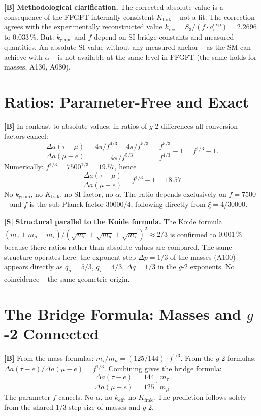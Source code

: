 \textbf{[B]} \textbf{Methodological clarification.} The corrected absolute value
is a consequence of the FFGFT-internally consistent $K_\text{frak}$ -- not a fit.
The correction agrees with the experimentally reconstructed value
$k_\text{rec}=S_3/(f\cdot a_e^\text{exp})=2{.}2696$ to $0{.}033\,\%$.
But: $k_\text{geom}$ and $f$ depend on SI bridge constants and measured quantities.
An absolute SI value without any measured anchor -- as the SM can achieve with
$\alpha$ -- is not available at the same level in FFGFT (the same holds for
masses, A130, A080).

\section{Ratios: Parameter-Free and Exact}

\textbf{[B]} In contrast to absolute values, in ratios of $g$-2 differences all
conversion factors cancel:
\[
  \frac{\Delta a(\tau-\mu)}{\Delta a(\mu-e)}
  = \frac{4\pi/f^{4/3}-4\pi/f^{5/3}}{4\pi/f^{5/3}}
  = \frac{f^{5/3}}{f^{4/3}} - 1
  = f^{1/3} - 1.
\]
Numerically: $f^{1/3}=7500^{1/3}=19{.}57$, hence
\[
  \boxed{\;\frac{\Delta a(\tau-\mu)}{\Delta a(\mu-e)} = f^{1/3}-1 = 18{.}57\;}
\]
No $k_\text{geom}$, no $K_\text{frak}$, no SI factor, no $\alpha$. The ratio
depends exclusively on $f=7500$ -- and $f$ is the sub-Planck factor $30000/4$,
following directly from $\xi=4/30000$.

\textbf{[S]} \textbf{Structural parallel to the Koide formula.} The Koide formula
$(m_e+m_\mu+m_\tau)/(\sqrt{m_e}+\sqrt{m_\mu}+\sqrt{m_\tau})^2\approx2/3$
is confirmed to $0{.}001\,\%$ because there ratios rather than absolute values are
compared. The same structure operates here: the exponent step $\Delta p=1/3$ of
the masses (A100) appears directly as $q_\mu=5/3$, $q_\tau=4/3$, $\Delta q=1/3$
in the $g$-2 exponents. No coincidence -- the same geometric origin.

\section{The Bridge Formula: Masses and \texorpdfstring{$g$-2}{g-2} Connected}

\textbf{[B]} From the mass formulas: $m_\tau/m_\mu=(125/144)\cdot f^{1/3}$.
From the $g$-2 formulas: $\Delta a(\tau-e)/\Delta a(\mu-e)=f^{1/3}$.
Combining gives the bridge formula:
\[
  \boxed{\;\frac{\Delta a(\tau-e)}{\Delta a(\mu-e)} = \frac{144}{125}\cdot\frac{m_\tau}{m_\mu}\;}
\]
The parameter $f$ cancels. No $\alpha$, no $k_\text{eff}$, no $K_\text{frak}$.
The prediction follows solely from the shared $1/3$ step size of masses and $g$-2.


